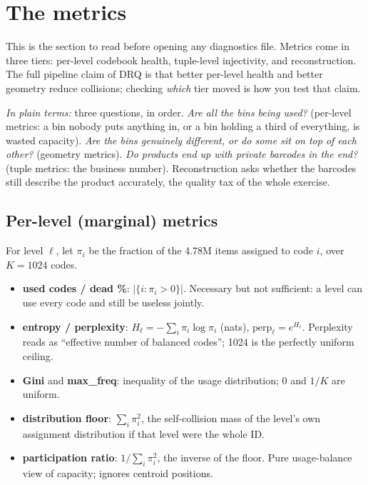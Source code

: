 \documentclass[11pt]{article}
\begin{document}
\section{The metrics}

This is the section to read before opening any diagnostics file. Metrics come in
three tiers: per-level codebook health, tuple-level injectivity, and
reconstruction. The full pipeline claim of DRQ is that better per-level health
and better geometry reduce collisions; checking \emph{which} tier moved is how
you test that claim.

\emph{In plain terms:} three questions, in order. \emph{Are all the bins being
used?} (per-level metrics: a bin nobody puts anything in, or a bin holding a
third of everything, is wasted capacity). \emph{Are the bins genuinely
different, or do some sit on top of each other?} (geometry metrics). \emph{Do
products end up with private barcodes in the end?} (tuple metrics: the business
number). Reconstruction asks whether the barcodes still describe the product
accurately, the quality tax of the whole exercise.

\subsection{Per-level (marginal) metrics}

For level $\ell$, let $\pi_i$ be the fraction of the 4.78M items assigned to
code $i$, over $K = 1024$ codes.

\begin{itemize}[nosep]
  \item \textbf{used codes / dead \%}: $|\{i : \pi_i > 0\}|$. Necessary but not
  sufficient: a level can use every code and still be useless jointly.
  \item \textbf{entropy / perplexity}: $H_\ell = -\sum_i \pi_i \log \pi_i$ (nats),
  $\mathrm{perp}_\ell = e^{H_\ell}$. Perplexity reads as ``effective number of
  balanced codes''; 1024 is the perfectly uniform ceiling.
  \item \textbf{Gini} and \textbf{max\_freq}: inequality of the usage distribution;
  0 and $1/K$ are uniform.
  \item \textbf{distribution floor}: $\sum_i \pi_i^2$, the self-collision mass of
  the level's own assignment distribution if that level were the whole ID.
  \item \textbf{participation ratio}: $1 / \sum_i \pi_i^2$, the inverse of the
  floor. Pure usage-balance view of capacity; ignores centroid positions.
\end{itemize}
\end{document}
